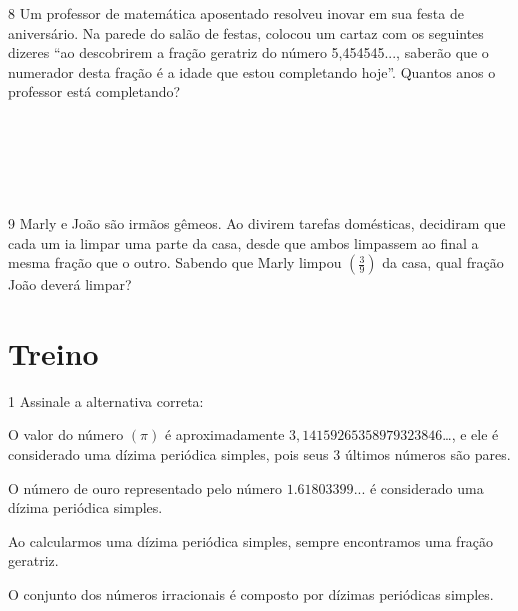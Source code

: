 \num{8} Um professor de matemática aposentado resolveu inovar em sua festa de
aniversário. Na parede do salão de festas, colocou um cartaz com os
seguintes dizeres ``ao descobrirem a fração geratriz do número
5,454545..., saberão que o numerador desta fração é a idade que estou
completando hoje''. Quantos anos o professor está completando?

\\
\\
\\
\\
\\



\num{9} Marly e João são irmãos gêmeos. Ao divirem tarefas domésticas,
decidiram que cada um ia limpar uma parte da casa, desde que ambos
limpassem ao final a mesma fração que o outro. Sabendo que Marly limpou
$(\frac{3}{9})$ da casa, qual fração João deverá limpar?
\\

\section{Treino}

\num{1} Assinale a alternativa correta:

\begin{escolha}
\item O valor do número $(\pi)$ é aproximadamente
$3,14159265358979323846$\ldots, e ele é considerado uma dízima periódica
simples, pois seus 3 últimos números são pares.
\item O número de ouro representado pelo número $1.61803399$... é considerado
uma dízima periódica simples.
\item Ao calcularmos uma dízima periódica simples, sempre encontramos uma
fração geratriz.
\item O conjunto dos números irracionais é composto por dízimas periódicas
simples.
\end{escolha}



